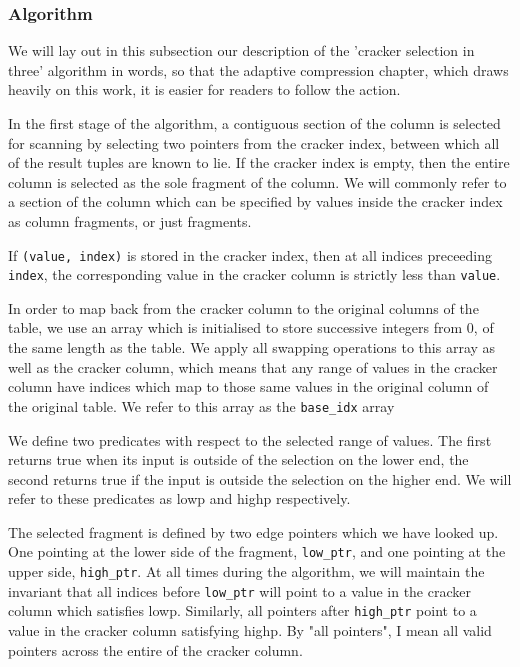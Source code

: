 \subsubsection{Algorithm}

We will lay out in this subsection our description of the 'cracker selection in three' algorithm
in words, so that the adaptive compression chapter, which draws heavily on this work, it is easier
for readers to follow the action.

In the first stage of the algorithm, a contiguous section of the column is selected for scanning by
selecting two pointers from the cracker index, between which all of the result tuples are known to
lie. If the cracker index is empty, then the entire column is selected as the sole fragment of the
column. We will commonly refer to a section of the column which can be specified by values inside the cracker index as column fragments, or just fragments.

If \texttt{(value, index)} is stored in the cracker index, then at all indices preceeding
\texttt{index}, the corresponding value in the cracker column is strictly less than \texttt{value}.

In order to map back from the cracker column to the original columns of the table, we use an array
which is initialised to store successive integers from 0, of the same length as the table. We apply
all swapping operations to this array as well as the cracker column, which means that any range of
values in the cracker column have indices which map to those same values in the original column of
the original table. We refer to this array as the \texttt{base\_idx} array

We define two predicates with respect to the selected range of values. The first returns true when
its input is outside of the selection on the lower end, the second returns true if the input is
outside the selection on the higher end. We will refer to these predicates as lowp and highp
respectively.

The selected fragment is defined by two edge pointers which we have looked up. One pointing at the
lower side of the fragment, \texttt{low\_ptr}, and one pointing at the upper side, \texttt{high\_ptr}.
At all times during the algorithm, we will maintain the invariant that all indices before
\texttt{low\_ptr} will point to a value in the cracker column which satisfies lowp. Similarly, all
pointers after \texttt{high\_ptr} point to a value in the cracker column satisfying highp. By "all pointers", I mean all valid pointers across the entire of the cracker column.

